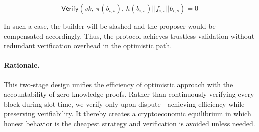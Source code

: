 \[
\mathsf{Verify}(vk,\, \pi(b_{i,s}),\, h(b_{i,s}) || f_{i,s} || b_{i,s}) = 0
\]

In such a case, the builder will be slashed and the proposer would be compensated accordingly.
Thus, the protocol achieves trustless validation without redundant verification overhead in the optimistic path.




\paragraph{Rationale.}
This two-stage design unifies the efficiency of optimistic approach with the accountability of zero-knowledge proofs. Rather than continuously verifying every block during slot time, we verify only upon dispute—achieving efficiency while preserving verifiability. It thereby creates a cryptoeconomic equilibrium in which honest behavior is the cheapest strategy and verification is avoided unless needed.

